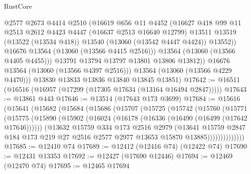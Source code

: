 \begin{lexlean}{RustCore}
\begin{coremodule}
                  @2577
                  @2673
                  @4414
                  @2510
                  (@16619
                    @656
                    @11
                    @4452
                    (@16627
                      @418
                      @99
                      @11
                      @2513
                      @2612
                      @4423
                      @4447
                      (@16637 @2513 @16640 @12799)
                      @13511
                      @13519
                      (@13522 (@13534 @418))
                      @13540
                      (@13060 (@13542 @4447 @4424))
                      @13552))
                  @16676
                  @13564
                  (@13060 (@13566 @4415 @2516)))
                @13564
                (@13060 (@13566 @4405 @4455)))
              @13791
              @13794
              @13797
              @13801
              @13806
              @13812))
          @16676
          @13564
          (@13060 (@13566 @4397 @2516)))
        @13564
        (@13060 (@13566 @4229 @4470)))
      @13830
      @13833
      @13836
      @13840
      @13845
      @13851)
@17642 := @16511 (@16516 (@16957 (@17299 (@17305 @17634 (@13164 @16494 @2847)))))
@17643 := @13861 @443
@17646 := @13514 (@17643 @173 @3699)
@17684 := @15616
    (@15641
      (@15682
        (@15684
          (@15686
            (@15707
              (@15725
                (@15742
                  (@15760
                    (@15771
                      (@15775
                        (@15890
                          (@15902
                            (@16024 (@16178 (@16336 (@16490 (@16499 (@17642 @17646))))))
                            (@13632
                              @15759
                              @334
                              @173
                              @2516
                              @2979
                              (@13641
                                @15759
                                @2847
                                @184
                                @173
                                @219
                                @27
                                @2516
                                @2577
                                @2977
                                @13653
                                @15870
                                @13885))))))))))))))
@17685 := @12410 @74
@17689 := @12412 (@12416 @74) (@12422 @74)
@17690 := @12431 @13353
@17692 := @12427 (@17690 @12446)
@17694 := @12469 (@12470 @74)
@17695 := @12465 @17694

\end{coremodule}
\end{lexlean}
